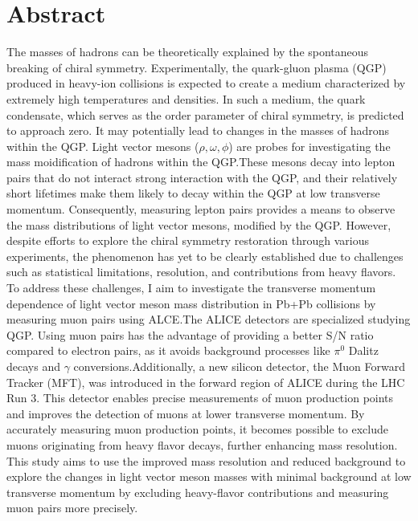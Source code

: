 \section*{Abstract}
The masses of hadrons can be theoretically explained by the spontaneous breaking of chiral symmetry. Experimentally, the quark-gluon plasma (QGP) produced in heavy-ion collisions is expected to create a medium characterized by extremely high temperatures and densities. In such a medium, the quark condensate, which serves as the order parameter of chiral symmetry, is predicted to approach zero. It may potentially lead to changes in the masses of hadrons within the QGP.\@
Light vector mesons ($\rho, \omega, \phi$) are  probes for investigating the mass moidification of hadrons within the QGP.\@ These mesons decay into lepton pairs that do not interact strong interaction with the QGP, and their relatively short lifetimes make them likely to decay within the QGP at low transverse momentum. Consequently, measuring lepton pairs provides a means to observe the mass distributions of light vector mesons, modified by the QGP.\@
However, despite efforts to explore the chiral symmetry restoration through various experiments, the phenomenon has yet to be clearly established due to challenges such as statistical limitations, resolution, and contributions from heavy flavors. To address these challenges, I aim to investigate the transverse momentum dependence of light vector meson mass distribution in Pb+Pb collisions by measuring muon pairs using ALCE.\@ The ALICE detectors are specialized studying QGP.\@
Using muon pairs has the advantage of providing a better S/N ratio compared to electron pairs, as it avoids background processes like $\pi^0$ Dalitz decays and $\gamma$ conversions.\@ Additionally, a new silicon detector, the Muon Forward Tracker (MFT), was introduced in the forward region of ALICE during the LHC Run 3.
This detector enables precise measurements of muon production points and improves the detection of muons at lower transverse momentum. By accurately measuring muon production points, it becomes possible to exclude muons originating from heavy flavor decays, further enhancing mass resolution.
This study aims to use the improved mass resolution and reduced background to explore the changes in light vector meson masses with minimal background at low transverse momentum by excluding heavy-flavor contributions and measuring muon pairs more precisely.

